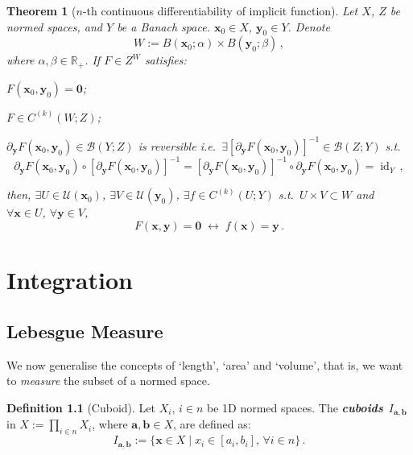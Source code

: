 \documentclass[openany]{book}
\theoremstyle{plain}
\newtheorem{theorem}{Theorem}[section] %
\theoremstyle{definition}
\newtheorem{definition}{Definition}[section] %
\newcommand*{\bv}{\boldsymbol} %
\newcommand*{\IFF}{\;\leftrightarrow\;} %
\newcommand{\emphbf}[1]{\emph{\textbf{#1}}}
\DeclareMathOperator{\id}{id}
\begin{document}
\begin{theorem}[$n$-th continuous differentiability of implicit function]
	\label{theorem: nth continuous differentiability of implicit function}
	Let $X$, $Z$ be normed spaces, and $Y$ be a Banach space.
	$\bv x_0 \in X$, $\bv y_0 \in Y$. Denote
	\begin{equation*}
		W := B(\bv x_0; \alpha) \times B(\bv y_0; \beta)\,,
	\end{equation*}
	where $\alpha, \beta \in \mathbb R_+$.
	If $F \in Z^W$ satisfies:
	\begin{conditionlist}[label=\alph*)]
		\item $F(\bv x_0, \bv y_0) = \bv 0$;
		\item $F \in C^{(k)}(W; Z)$; 
		\item $\partial_{\bv y} F(\bv x_0, \bv y_0) \in \mathcal B(Y; Z)$ is reversible i.e.\ $\exists [\partial_{\bv y} F(\bv x_0, \bv y_0)]^{-1} \in \mathcal B(Z; Y)$ s.t.
		\begin{equation*}
			\partial_{\bv y} F(\bv x_0, \bv y_0) \circ [\partial_{\bv y} F(\bv x_0, \bv y_0)]^{-1} 
			= [\partial_{\bv y} F(\bv x_0, \bv y_0)]^{-1} \circ \partial_{\bv y} F(\bv x_0, \bv y_0) = \id_Y\,,
		\end{equation*}
	\end{conditionlist}
	then, $\exists U \in \mathscr U(\bv x_0)$, $\exists V \in \mathscr U(\bv y_0)$, $\exists f \in C^{(k)}(U; Y)$ s.t.\ $U \times V \subset W$ and $\forall \bv x \in U$, $\forall \bv y \in V$, 
	\begin{equation*}
		F(\bv x, \bv y) = \bv 0
		\IFF
		f(\bv x) = \bv y\,.
	\end{equation*}
\end{theorem}



\chapter{Integration}

\section{Lebesgue Measure}

We now generalise the concepts of `length', `area' and `volume', that is, we want to \emph{measure} the subset of a normed space.


\begin{definition}[Cuboid]
	Let $X_i$, $i \in n$ be 1D normed spaces. 
	The \emphbf{cuboids}~$I_{\bv a, \bv b}$ in $X := \prod_{i \in n} X_i$, where $\bv a, \bv b \in X$, are defined as:
	\begin{equation*}
		I_{\bv a, \bv b} 
			:= \{\bv x \in X \mid x_i \in  [a_i, b_i],\, \forall i \in n\}\,.
	\end{equation*}
\end{definition}
\end{document}
